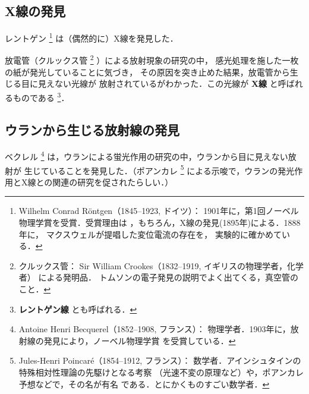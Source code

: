        \subsection{X線の発見}
            レントゲン
                \footnote{
                    Wilhelm Conrad R\"{o}ntgen（1845--1923, ドイツ）：
                    1901年に，第1回ノーベル物理学賞を受賞．受賞理由は
                    ，もちろん，X線の発見(1895年)による．1888年に，
                    マクスウェルが提唱した変位電流の存在を，
                    実験的に確かめている．
                }
            は（偶然的に）X線を発見した．

            放電管（クルックス管
                \footnote{
                    クルックス管：
                    Sir William Crookes（1832--1919, イギリスの物理学者，化学者）
                    による発明品．
                    トムソンの電子発見の説明でよく出てくる，真空管のこと．
                }
            ）による放射現象の研究の中，
            感光処理を施した一枚の紙が発光していることに気づき，
            その原因を突き止めた結果，放電管から生じる目に見えない光線が
            放射されているがわかった．この光線が \textbf{X線} と呼ばれるものである
                \footnote{
                    \textbf{レントゲン線} とも呼ばれる．
                }．

        \subsection{ウランから生じる放射線の発見}
            ベクレル
                \footnote{
                    Antoine Henri Becquerel（1852--1908, フランス）：
                    物理学者．1903年に，放射線の発見により，ノーベル物理学賞
                    を受賞している．
                }
            は，ウランによる蛍光作用の研究の中，ウランから目に見えない放射が
            生じていることを発見した．（ポアンカレ
                \footnote{
                    Jules-Henri Poincar\'{e}（1854--1912, フランス）：
                    数学者．アインシュタインの特殊相対性理論の先駆けとなる考察
                    （光速不変の原理など）や，ポアンカレ予想などで，その名が有名
                    である．とにかくものすごい数学者．
                }
            による示唆で，ウランの発光作用とX線との関連の研究を促されたらしい．）


